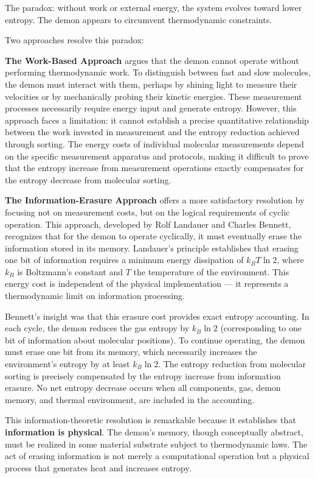 The paradox: without work or external energy, the system evolves toward lower entropy. The demon appears to circumvent thermodynamic constraints.

Two approaches resolve this paradox:

\textbf{The Work-Based Approach} argues that the demon cannot operate without performing thermodynamic work. To distinguish between fast and slow molecules, the demon must interact with them, perhaps by shining light to measure their velocities or by mechanically probing their kinetic energies. These measurement processes necessarily require energy input and generate entropy. However, this approach faces a limitation: it cannot establish a precise quantitative relationship between the work invested in measurement and the entropy reduction achieved through sorting. The energy costs of individual molecular measurements depend on the specific measurement apparatus and protocols, making it difficult to prove that the entropy increase from measurement operations exactly compensates for the entropy decrease from molecular sorting.

\textbf{The Information-Erasure Approach} offers a more satisfactory resolution by focusing not on measurement costs, but on the logical requirements of cyclic operation. This approach, developed by Rolf Landauer and Charles Bennett, recognizes that for the demon to operate cyclically, it must eventually erase the information stored in its memory. Landauer's principle establishes that erasing one bit of information requires a minimum energy dissipation of $k_B T \ln 2$, where $k_B$ is Boltzmann's constant and $T$ the temperature of the environment. This energy cost is independent of the physical implementation — it represents a thermodynamic limit on information processing.

Bennett's insight was that this erasure cost provides exact entropy accounting. In each cycle, the demon reduces the gas entropy by $k_B \ln 2$ (corresponding to one bit of information about molecular positions). To continue operating, the demon must erase one bit from its memory, which necessarily increases the environment's entropy by at least $k_B \ln 2$. The entropy reduction from molecular sorting is precisely compensated by the entropy increase from information erasure. No net entropy decrease occurs when all components, gas, demon memory, and thermal environment, are included in the accounting.

This information-theoretic resolution is remarkable because it establishes that \textbf{information is physical}. The demon's memory, though conceptually abstract, must be realized in some material substrate subject to thermodynamic laws. The act of erasing information is not merely a computational operation but a physical process that generates heat and increases entropy.

